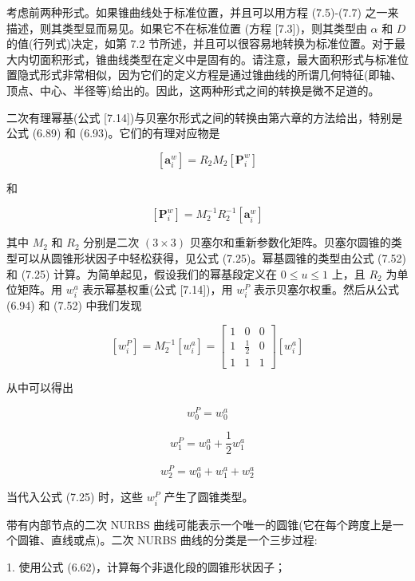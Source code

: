 \documentclass[../main.tex]{subfiles}
\begin{document}
考虑前两种形式。如果锥曲线处于标准位置，并且可以用方程 (7.5)-(7.7) 之一来描述，则其类型显而易见。如果它不在标准位置 (方程 [7.3])，则其类型由 \(\alpha\) 和 \(D\) 的值(行列式)决定，如第 7.2 节所述，并且可以很容易地转换为标准位置。对于最大内切面积形式，锥曲线类型在定义中是固有的。请注意，最大面积形式与标准位置隐式形式非常相似，因为它们的定义方程是通过锥曲线的所谓几何特征(即轴、顶点、中心、半径等)给出的。因此，这两种形式之间的转换是微不足道的。

二次有理幂基(公式 [7.14])与贝塞尔形式之间的转换由第六章的方法给出，特别是公式 (6.89) 和 (6.93)。它们的有理对应物是

\[
\left\lbrack  {\mathbf{a}}_{i}^{w}\right\rbrack   = {R}_{2}{M}_{2}\left\lbrack  {\mathbf{P}}_{i}^{w}\right\rbrack   \tag{7.51}
\]

和

\[
\left\lbrack  {\mathbf{P}}_{i}^{w}\right\rbrack   = {M}_{2}^{-1}{R}_{2}^{-1}\left\lbrack  {\mathbf{a}}_{i}^{w}\right\rbrack   \tag{7.52}
\]

其中 \({M}_{2}\) 和 \({R}_{2}\) 分别是二次 \(\left( {3 \times  3}\right)\) 贝塞尔和重新参数化矩阵。贝塞尔圆锥的类型可以从圆锥形状因子中轻松获得，见公式 (7.25)。幂基圆锥的类型由公式 (7.52) 和 (7.25) 计算。为简单起见，假设我们的幂基段定义在 \(0 \leq  u \leq  1\) 上，且 \({R}_{2}\) 为单位矩阵。用 \({w}_{i}^{a}\) 表示幂基权重(公式 [7.14])，用 \({w}_{i}^{P}\) 表示贝塞尔权重。然后从公式 (6.94) 和 (7.52) 中我们发现

\[
\left\lbrack  {w}_{i}^{P}\right\rbrack   = {M}_{2}^{-1}\left\lbrack  {w}_{i}^{a}\right\rbrack   = \left\lbrack  \begin{array}{lll} 1 & 0 & 0 \\  1 & \frac{1}{2} & 0 \\  1 & 1 & 1 \end{array}\right\rbrack  \left\lbrack  {w}_{i}^{a}\right\rbrack
\]

从中可以得出

\[
{w}_{0}^{P} = {w}_{0}^{a}
\]

\[
{w}_{1}^{P} = {w}_{0}^{a} + \frac{1}{2}{w}_{1}^{a}
\]

\[
{w}_{2}^{P} = {w}_{0}^{a} + {w}_{1}^{a} + {w}_{2}^{a} \tag{7.53}
\]

当代入公式 (7.25) 时，这些 \({w}_{i}^{P}\) 产生了圆锥类型。

带有内部节点的二次 NURBS 曲线可能表示一个唯一的圆锥(它在每个跨度上是一个圆锥、直线或点)。二次 NURBS 曲线的分类是一个三步过程:

1. 使用公式 (6.62)，计算每个非退化段的圆锥形状因子；
\end{document}
